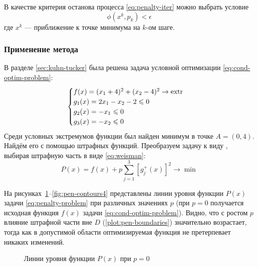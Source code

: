 В качестве критерия останова процесса \eqref{eq:penalty-iter} можно
выбрать условие
\begin{equation*}
  \phi(x^k, p_k) < \epsilon
\end{equation*}
где $x^k$ — приближение к точке минимума на $k$-ом шаге.

\subsubsection{Применение метода}
\label{sec:penalty-usage}

В разделе \ref{sec:kuhn-tucker} была решена задача условной
оптимизации \eqref{eq:cond-optim-problem}:
\begin{equation*}
  \begin{cases}
    f(x) = (x_1+4)^2 + (x_2-4)^2 \to \operatorname{extr} \\
    g_1(x) = 2x_1 - x_2 - 2 \leqslant 0 \\
    g_2(x) = -x_1 \leqslant 0 \\
    g_3(x) = -x_2 \leqslant 0
  \end{cases}
\end{equation*}
Среди условных экстремумов функции был найден минимум в точке $A = (0,
4)$. Найдём его с помощью штрафных функций. Преобразуем задачу к виду
\label{eq:penalty-iter}, выбирая штрафную часть в виде
\eqref{eq:weisman}:
\begin{equation}
  \label{eq:penalty-problem}
  P(x) = f(x) + p \sum_{j=1}^3{ \left [ g_j^+(x) \right ]^2} \to \min
\end{equation}

На рисунках \ref{fig:pen-contours1}--\ref{fig:pen-contours4}
представлены линии уровня функции $P(x)$ задачи
\eqref{eq:penalty-problem} при различных значениях $p$ (при $p=0$
получается исходная функция $f(x)$ задачи
\eqref{eq:cond-optim-problem}). Видно, что с ростом $p$ влияние
штрафной части вне $D$ (\ref{plot:pen-boundaries}) значительно
возрастает, тогда как в допустимой области оптимизируемая функция не
претерпевает никаких изменений.

\begin{figure}[!thb]
  \centering
  \caption{Линии уровня функции $P(x)$ при $p=0$}
  \label{fig:pen-contours1}
\end{figure}

